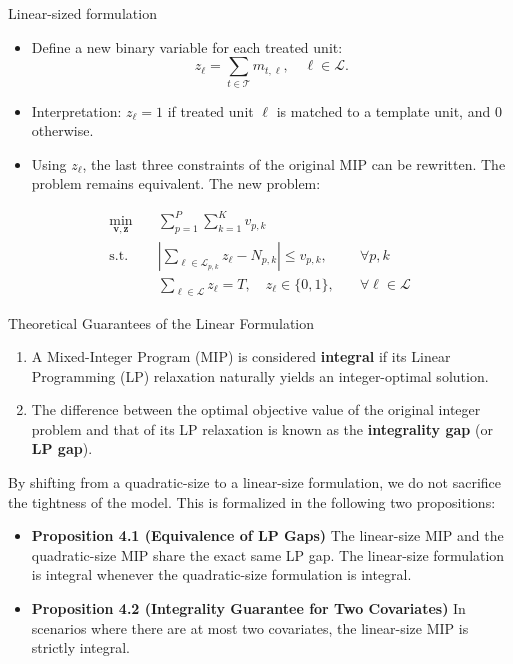 \documentclass{beamer}
\begin{document}
\begin{frame}{Linear-sized formulation}
\begin{itemize}
    \item Define a new binary variable for each treated unit: 
    \[
        z_\ell = \sum_{t \in \mathcal{T}} m_{t,\ell}, \quad \ell \in \mathcal{L}.
    \]
    
    \item Interpretation: \(z_\ell = 1\) if treated unit \(\ell\) is matched to a template unit, and \(0\) otherwise.
    
    \item Using \(z_\ell\), the last three constraints of the original MIP can be rewritten.  
    The problem remains equivalent. The new problem:
\end{itemize}
	

$$
\begin{aligned}
\min_{\mathbf{v}, \mathbf{z}} \quad & \sum_{p=1}^{P} \sum_{k=1}^{K} v_{p,k} \\
\text{s.t.} \quad & \left| \sum_{\ell \in \mathcal{L}_{p,k}} z_\ell - N_{p,k} \right| \leq v_{p,k}, \quad & \forall p, k \\
& \sum_{\ell \in \mathcal{L}} z_\ell = T , \quad  z_\ell \in \{0, 1\}, \quad & \forall \ell \in \mathcal{L}
\end{aligned}
$$

\end{frame}
\begin{frame}{Theoretical Guarantees of the Linear Formulation}
\begin{enumerate}
	\item A Mixed-Integer Program (MIP) is considered \textbf{integral} if its Linear Programming (LP) relaxation naturally yields an integer-optimal solution. 
	\item The difference between the optimal objective value of the original integer problem and that of its LP relaxation is known as the \textbf{integrality gap} (or \textbf{LP gap}).
\end{enumerate}

\end{frame}

\begin{frame}
By shifting from a quadratic-size to a linear-size formulation, we do not sacrifice the tightness of the model. This is formalized in the following two propositions:

\begin{itemize}
	\item \textbf{Proposition 4.1 (Equivalence of LP Gaps)} The linear-size MIP and the quadratic-size MIP share the exact same LP gap. The linear-size formulation is integral whenever the quadratic-size formulation is integral.
\item \textbf{Proposition 4.2 (Integrality Guarantee for Two Covariates)} In scenarios where there are at most two covariates, the linear-size MIP is strictly integral.
\end{itemize}


\end{frame}
\end{document}
